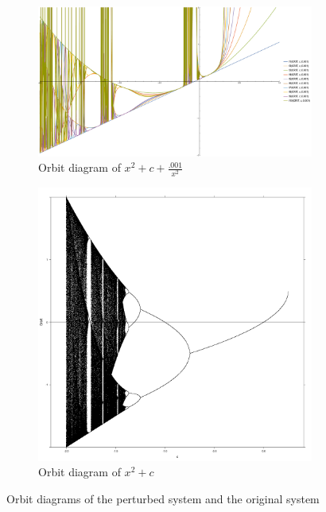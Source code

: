 		\begin{figure}[h]
			\centering
			\begin{subfigure}[b]{0.5\textwidth}
					\includegraphics[width=\textwidth]{./img/pert}
					\caption{Orbit diagram of $x^2 + c + \frac{.001}{x^2}$}
					\label{pert}
			\end{subfigure}%
			\begin{subfigure}[b]{0.5\textwidth}
					\includegraphics[width=\textwidth]{./img/orig}
					\caption{Orbit diagram of $x^2 + c$}
					\label{stand}%
			\end{subfigure}
			\caption{Orbit diagrams of the perturbed system and the original system}\label{fig:orbits}
		\end{figure}

